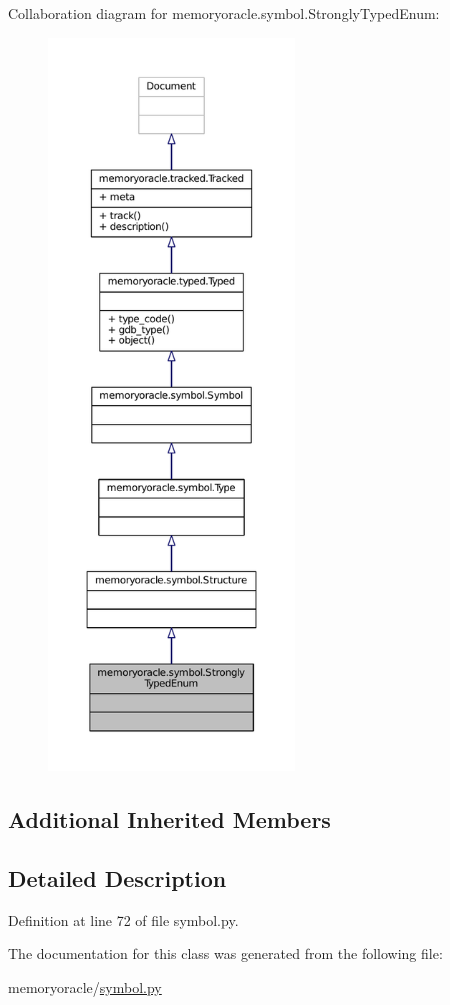 Collaboration diagram for memoryoracle.\+symbol.\+Strongly\+Typed\+Enum\+:
\nopagebreak
\begin{figure}[H]
\begin{center}
\leavevmode
\includegraphics[height=550pt]{classmemoryoracle_1_1symbol_1_1StronglyTypedEnum__coll__graph}
\end{center}
\end{figure}
\subsection*{Additional Inherited Members}


\subsection{Detailed Description}


Definition at line 72 of file symbol.\+py.



The documentation for this class was generated from the following file\+:\begin{DoxyCompactItemize}
\item 
memoryoracle/\hyperlink{symbol_8py}{symbol.\+py}\end{DoxyCompactItemize}
